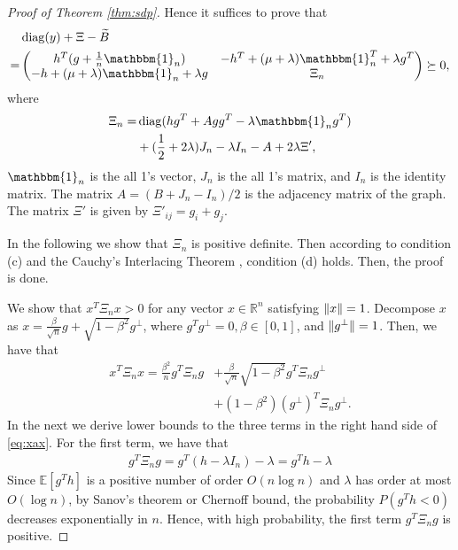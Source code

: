 \documentclass[conference]{IEEEtran}
\DeclarePairedDelimiter\norm{\lVert}{\rVert}
\DeclareMathOperator{\diag}{diag}
\begin{document}
\begin{proof}[Proof of Theorem \ref{thm:sdp}]
	Hence it suffices to prove that
	\begin{align}
		&\diag(y) + \Xi - \widetilde{B} \nonumber\\
		=& \begin{pmatrix} h^T (g+\frac{1}{n}\mathbbm{1}_n) & -h^T +(\mu + \lambda)\mathbbm{1}_n^T + \lambda g^T\\
			-h+(\mu + \lambda )\mathbbm{1}_n + \lambda g& \Xi_n \end{pmatrix}
		\succeq 0, 
	\end{align}
	where
	\begin{align}\label{eq:Xi_n}
		\Xi_n =&\diag(hg^T + Agg^T -\lambda \mathbbm{1}_ng^T)  \nonumber\\
		&+ (\frac{1}{2} +2\lambda) J_n -\lambda I_n - A + 2\lambda \Xi',
	\end{align}
	$\mathbbm{1}_n$ is the all 1's vector, $J_n$ is the all 1's matrix, and $I_n$ is the identity matrix. The matrix $A=(B+J_n-I_n)/2$ is the adjacency matrix of the graph.
	The matrix $\Xi'$ is given by $\Xi'_{ij}=g_i + g_j$.
	
	In the following we show that $\Xi_n$ is positive definite. Then according to condition (c) and the
	Cauchy's Interlacing Theorem \cite{hwang}, condition (d) holds.
	Then, the proof is done.
	
	We show that $x^T \Xi_n x>0$ for any vector $x \in \mathbb{R}^n$ satisfying $\norm{x}=1$. Decompose $x$ as $x=\frac{\beta}{\sqrt{n}} g
	+ \sqrt{1-\beta^2} g^{\perp}$, where $g^Tg^{\perp}=0, \beta \in [0,1]$, and $\norm{g^{\perp}}=1$. Then, we have that 
	\begin{align}
		x^T \Xi_n x = \frac{\beta^2}{n} g^T \Xi_n g  &
		+		\frac{\beta}{\sqrt{n}}\sqrt{1-\beta^2} g^T \Xi_n g^{\perp}
		\nonumber\\\label{eq:xax}
		&+
		(1-\beta^2)(g^{\perp})^T \Xi_n g^{\perp}. 
	\end{align}
	In the next we derive lower bounds to the three terms in the right hand side of \eqref{eq:xax}.
	For the first term, we have that
	\begin{align*}
		g^T \Xi_n g = g^T(h -\lambda I_n) -\lambda  = g^T h-\lambda
	\end{align*}
	Since $\mathbb{E}[g^T h]$ is a positive number of order $O(n\log n)$ and $\lambda$ has order at most $O(\log n)$,
	by Sanov's theorem or Chernoff bound, the probability 
	$P(g^T h < 0)$ decreases exponentially in $n$. Hence, with high probability, the first term $g^T \Xi_n g$ is positive.
	

\end{proof}
\end{document}
